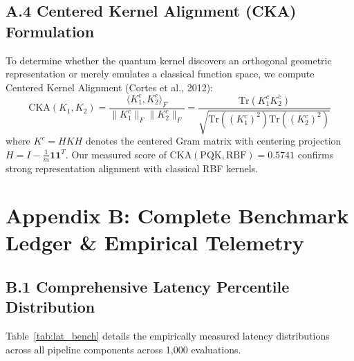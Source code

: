 \documentclass[10pt,a4paper]{article}
\begin{document}
\subsection*{A.4 Centered Kernel Alignment (CKA) Formulation}
To determine whether the quantum kernel discovers an orthogonal geometric representation or merely emulates a classical function space, we compute Centered Kernel Alignment (Cortes et al., 2012):
\begin{equation}
\mathrm{CKA}(K_1, K_2) = \frac{\langle K_1^c, K_2^c \rangle_F}{\|K_1^c\|_F \|K_2^c\|_F} = \frac{\mathrm{Tr}(K_1^c K_2^c)}{\sqrt{\mathrm{Tr}((K_1^c)^2) \mathrm{Tr}((K_2^c)^2)}}
\end{equation}
where $K^c = H K H$ denotes the centered Gram matrix with centering projection $H = I - \frac{1}{m}\mathbf{1}\mathbf{1}^T$. Our measured score of \textbf{$\mathrm{CKA}(\text{PQK}, \text{RBF}) = 0.5741$} confirms strong representation alignment with classical RBF kernels.

\clearpage


\section*{Appendix B: Complete Benchmark Ledger \& Empirical Telemetry}

\subsection*{B.1 Comprehensive Latency Percentile Distribution}
Table~\ref{tab:lat_bench} details the empirically measured latency distributions across all pipeline components across 1,000 evaluations.
\end{document}
